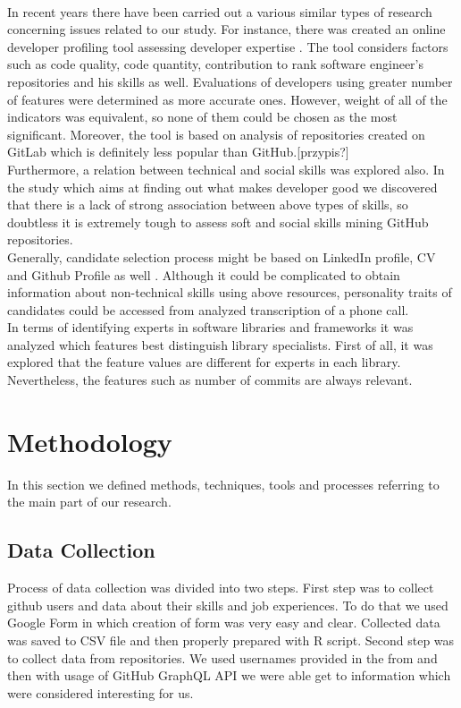 \documentclass[graybox]{svmult}
\begin{document}
\\In recent years there have been carried out a various similar types of research concerning issues related to our study. For instance, there was created an online developer profiling tool assessing developer expertise \cite{GitLabProfilingTool}. The tool considers factors such as code quality, code quantity, contribution to rank  software engineer’s repositories and his skills as well. Evaluations of developers using greater number of features were determined as more accurate ones. However, weight of all of the indicators was equivalent, so none of them could be chosen as the most significant. Moreover, the tool is based on analysis of repositories created on GitLab which is definitely less popular than GitHub.[przypis?]
\\Furthermore, a relation between technical and social skills \cite{WhatMakesGoodDev} was explored also. In the study which aims at finding out what makes developer good we discovered that there is a lack of strong association between above types of skills, so doubtless it is extremely tough to assess soft and social skills mining GitHub repositories.
\\Generally, candidate selection process might be based on LinkedIn profile, CV and Github Profile as well \cite{CandidateSelection}. Although it could be complicated to obtain information about non-technical skills using above resources, personality traits of candidates could be accessed from analyzed transcription of a phone call.
\\In terms of identifying experts in software libraries and frameworks \cite{SoftwareLibraries} it was analyzed which features best distinguish library specialists. First of all, it was explored that the feature values are different for experts in each library. Nevertheless, the features such as number of commits are always relevant.


\section{Methodology}
In this section we defined methods, techniques, tools and processes referring to the main part of our research.
\subsection{Data Collection}
Process of data collection was divided into two steps. First step was to collect github users and data about their skills and job experiences. To do that we used Google Form in which creation of form was very easy and clear. Collected data was saved to CSV file and then properly prepared with R script. Second step was to collect data from repositories. We used usernames provided in the from and then with usage of GitHub GraphQL API we were able get to information which were considered interesting for us.
\end{document}
